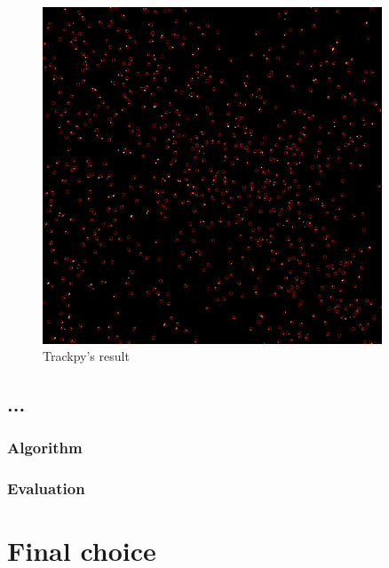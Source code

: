 \begin{figure}
	\centerline{\includegraphics[width=0.9\textwidth]{images/locate/trackpy.png}}
	\caption{\centering Trackpy's result}
	\label{fig:locate:tracpy}
\end{figure}

\subsection{...}
\subsubsection{Algorithm}
\subsubsection{Evaluation}


\section{Final choice}
